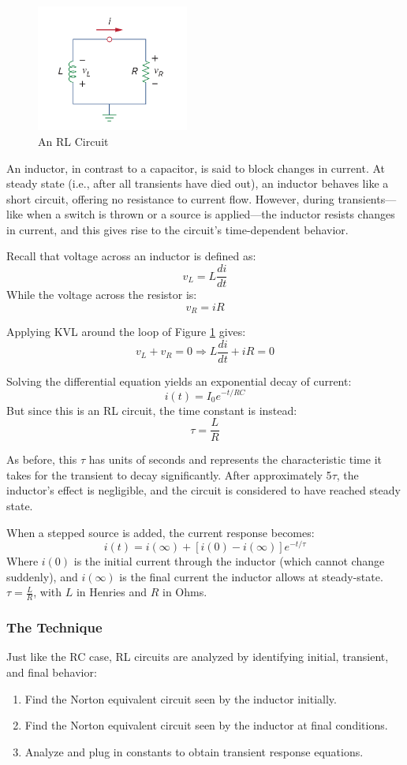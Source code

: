\documentclass[12pt]{article}
\begin{document}
\begin{figure}[H]
	\centering
	\includegraphics[width=5cm]{e5_th2}
	\caption{An RL Circuit}
	\label{fig:theory2}
\end{figure}

An inductor, in contrast to a capacitor, is said to block changes in current.
At steady state (i.e., after all transients have died out), an inductor behaves
like a short circuit, offering no resistance to current flow. However, during
transients—like when a switch is thrown or a source is applied—the inductor
resists changes in current, and this gives rise to the circuit's time-dependent
behavior.

Recall that voltage across an inductor is defined as:
\[
	v_L = L \frac{di}{dt}
\]
While the voltage across the resistor is:
\[
	v_R = iR
\]

Applying KVL around the loop of Figure \ref{fig:theory2} gives:
\[
	v_L + v_R = 0
	\Rightarrow L \frac{di}{dt} + iR = 0
\]

Solving the differential equation yields an exponential decay of current:
\[
	i(t) = I_0 e^{-t/RC}
\]
But since this is an RL circuit, the time constant is instead:
\[
	\tau = \frac{L}{R}
\]

As before, this $\tau$ has units of seconds and represents the characteristic
time it takes for the transient to decay significantly. After approximately
5$\tau$, the inductor's effect is negligible, and the circuit is considered to
have reached steady state.

When a stepped source is added, the current response becomes:
\[
	i(t) = i(\infty) + [i(0) - i(\infty)]e^{-t/\tau}
\]
Where $i(0)$ is the initial current through the inductor (which cannot change
suddenly), and $i(\infty)$ is the final current the inductor allows at
steady-state. $\tau = \frac{L}{R}$, with $L$ in Henries and $R$ in Ohms.

\subsubsection{The Technique}
Just like the RC case, RL circuits are analyzed by identifying initial,
transient, and final behavior:
\begin{enumerate}
	\item Find the Norton equivalent circuit seen by the inductor initially.
	\item Find the Norton equivalent circuit seen by the inductor at final
	      conditions.
	\item Analyze and plug in constants to obtain transient response
	      equations.
\end{enumerate}
\end{document}
